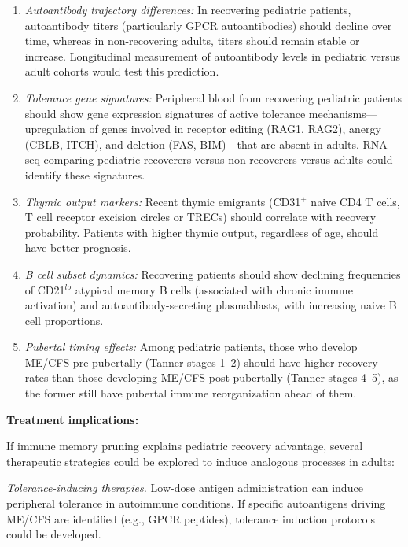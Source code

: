 \begin{hypothesis}
\begin{enumerate}
    \item \textit{Autoantibody trajectory differences:} In recovering pediatric patients, autoantibody titers (particularly GPCR autoantibodies) should decline over time, whereas in non-recovering adults, titers should remain stable or increase. Longitudinal measurement of autoantibody levels in pediatric versus adult cohorts would test this prediction.

    \item \textit{Tolerance gene signatures:} Peripheral blood from recovering pediatric patients should show gene expression signatures of active tolerance mechanisms---upregulation of genes involved in receptor editing (RAG1, RAG2), anergy (CBLB, ITCH), and deletion (FAS, BIM)---that are absent in adults. RNA-seq comparing pediatric recoverers versus non-recoverers versus adults could identify these signatures.

    \item \textit{Thymic output markers:} Recent thymic emigrants (CD31$^+$ naive CD4 T cells, T cell receptor excision circles or TRECs) should correlate with recovery probability. Patients with higher thymic output, regardless of age, should have better prognosis.

    \item \textit{B cell subset dynamics:} Recovering patients should show declining frequencies of CD21$^{lo}$ atypical memory B cells (associated with chronic immune activation) and autoantibody-secreting plasmablasts, with increasing naive B cell proportions.

    \item \textit{Pubertal timing effects:} Among pediatric patients, those who develop ME/CFS pre-pubertally (Tanner stages 1--2) should have higher recovery rates than those developing ME/CFS post-pubertally (Tanner stages 4--5), as the former still have pubertal immune reorganization ahead of them.
\end{enumerate}

\textbf{Treatment implications:}

If immune memory pruning explains pediatric recovery advantage, several therapeutic strategies could be explored to induce analogous processes in adults:

\textit{Tolerance-inducing therapies.} Low-dose antigen administration can induce peripheral tolerance in autoimmune conditions. If specific autoantigens driving ME/CFS are identified (e.g., GPCR peptides), tolerance induction protocols could be developed.


\end{hypothesis}
